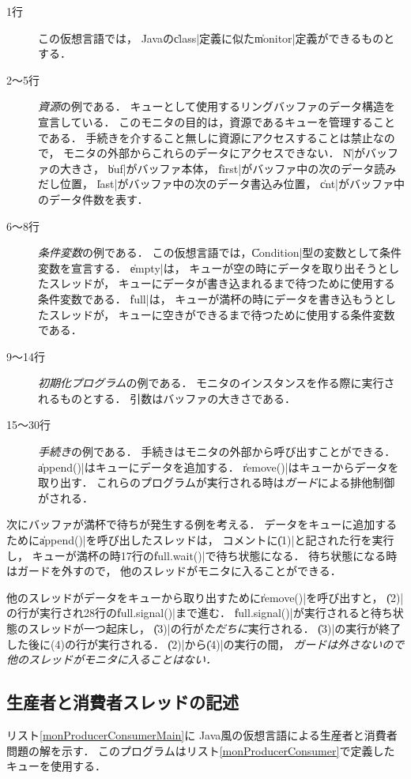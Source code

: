 \begin{description}
\item [1行] この仮想言語では，
  Javaの\|class|定義に似た\|monitor|定義ができるものとする．
\item [2〜5行] \emph{資源}の例である．
  キューとして使用するリングバッファのデータ構造を宣言している．
  このモニタの目的は，資源であるキューを管理することである．
  手続きを介すること無しに資源にアクセスすることは禁止なので，
  モニタの外部からこれらのデータにアクセスできない．
  \|N|がバッファの大きさ，
  \|buf|がバッファ本体，
  \|first|がバッファ中の次のデータ読みだし位置，
  \|last|がバッファ中の次のデータ書込み位置，
  \|cnt|がバッファ中のデータ件数を表す．
\item [6〜8行] \emph{条件変数}の例である．
  この仮想言語では，\|Condition|型の変数として条件変数を宣言する．
  \|empty|は，
  キューが空の時にデータを取り出そうとしたスレッドが，
  キューにデータが書き込まれるまで待つために使用する条件変数である．
  \|full|は，
  キューが満杯の時にデータを書き込もうとしたスレッドが，
  キューに空きができるまで待つために使用する条件変数である．
\item [9〜14行] \emph{初期化プログラム}の例である．
  モニタのインスタンスを作る際に実行されるものとする．
  引数はバッファの大きさである．
\item [15〜30行] \emph{手続き}の例である．
  手続きはモニタの外部から呼び出すことができる．
  \|append()|はキューにデータを追加する．
  \|remove()|はキューからデータを取り出す．
  これらのプログラムが実行される時は\emph{ガード}による排他制御がされる．
\end{description}

次にバッファが満杯で待ちが発生する例を考える．
データをキューに追加するために\|append()|を呼び出したスレッドは，
コメントに\|(1)|と記された行を実行し，
キューが満杯の時17行の\|full.wait()|で待ち状態になる．
待ち状態になる時はガードを外すので，
他のスレッドがモニタに入ることができる．

他のスレッドがデータをキューから取り出すために\|remove()|を呼び出すと，
\|(2)|の行が実行され28行の\|full.signal()|まで進む．
\|full.signal()|が実行されると待ち状態のスレッドが一つ起床し，
\|(3)|の行が\emph{ただちに}実行される．
\|(3)|の実行が終了した後に(4)の行が実行される．
\|(2)|から\|(4)|の実行の間，
\emph{ガードは外さないので他のスレッドがモニタに入ることはない．}

\subsection{生産者と消費者スレッドの記述}
リスト\ref{monProducerConsumerMain}に
Java風の仮想言語による生産者と消費者問題の解を示す．
このプログラムはリスト\ref{monProducerConsumer}で定義したキューを使用する．

